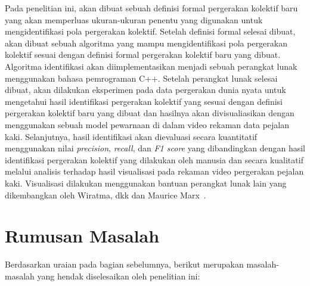 Pada penelitian ini, akan dibuat sebuah definisi formal pergerakan kolektif baru yang akan memperluas ukuran-ukuran penentu yang digunakan untuk mengidentifikasi pola pergerakan kolektif. Setelah definisi formal selesai dibuat, akan dibuat sebuah algoritma yang mampu mengidentifikasi pola pergerakan kolektif sesuai dengan definisi formal pergerakan kolektif baru yang dibuat. Algoritma identifikasi akan diimplementasikan menjadi sebuah perangkat lunak menggunakan bahasa pemrograman C++. Setelah perangkat lunak selesai dibuat, akan dilakukan eksperimen pada data pergerakan dunia nyata untuk mengetahui hasil identifikasi pergerakan kolektif yang sesuai dengan definisi pergerakan kolektif baru yang dibuat dan hasilnya akan divisualiasikan dengan menggunakan sebuah model pewarnaan di dalam video rekaman data pejalan kaki. Selanjutnya, hasil identifikasi akan dievaluasi secara kuantitatif menggunakan nilai \textit{precision}, \textit{recall}, dan \textit{F1 score} yang dibandingkan dengan hasil identifikasi pergerakan kolektif yang dilakukan oleh manusia dan secara kualitatif melalui analisis terhadap hasil visualisasi pada rekaman video pergerakan pejalan kaki. Visualisasi dilakukan menggunakan bantuan perangkat lunak lain yang dikembangkan oleh Wiratma, dkk dan Maurice Marx~\cite{wiratma:software}.

\iffalse

\lionov{tambahin bahwa setelah itu akan dilakukan eksperimen dengan data nyata lintasan yang tersedia di internet (lihat bab 5 di thesis) dan akan dibandingkan hasilnya dengan hasil dari eksperimen sebelumnya (jangna lupa jelasin bahwa di eksperimen sebelumnya, yang dibandingkan itu cuma grup, gak ngebandingin tempat dan waktu). Terus harus disinggung bahwa di data eksperimen itu, udah ada grup yang ditentukan oleh manusia, jadi nanti hasil program akan dibandingkan dengan kunci jawabannya.} \cristopher{Di atas kan udah saya sebuat kalo identifikasinya akan diuji dengan dibandingkan, kalo gitu kudu rephrase atau biarin ajah ko?}

\fi

\section{Rumusan Masalah}
\label{sec:rumusan}

Berdasarkan uraian pada bagian sebelumnya, berikut merupakan masalah-masalah yang hendak diselesaikan oleh penelitian ini:
\iffalse


